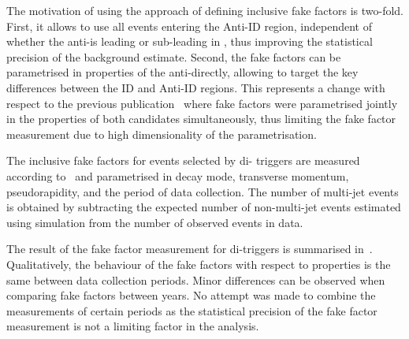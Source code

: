 {  %


  The motivation of using the approach of defining inclusive fake
  factors is two-fold. First, it allows to use all events entering the
  Anti-ID region, independent of whether the anti-\tauhadvis is
  leading or sub-leading in \pT, thus improving the statistical
  precision of the background estimate. Second, the fake factors can
  be parametrised in properties of the anti-\tauhadvis directly,
  allowing to target the key differences between the ID and Anti-ID
  regions. This represents a change with respect to the previous
  publication~\cite{HIGG-2016-16-witherratum} where fake factors were
  parametrised jointly in the properties of both \tauhadvis candidates
  simultaneously, thus limiting %
  the fake factor measurement due to high dimensionality of the
  parametrisation.}

The inclusive fake factors for events selected by di-\tauhadvis
triggers are measured according to~ and
parametrised in \tauhadvis decay mode, transverse momentum,
pseudorapidity, and the period of data collection. The number of
multi-jet events is obtained by subtracting the expected number of
non-multi-jet events estimated using simulation from the number of
observed events in data.

The result of the fake factor measurement for di-\tauhadvis triggers
is summarised in~. Qualitatively, the
behaviour of the fake factors with respect to \tauhadvis properties is
the same between data collection periods. Minor differences can be
observed when comparing fake factors between years. No attempt was
made to combine the measurements of certain periods as the statistical
precision of the fake factor measurement is not a limiting factor in
the analysis.

